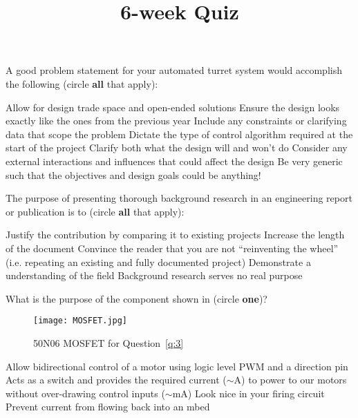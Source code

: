\documentclass[addpoints,answers]{exam}
\title{6-week Quiz}
\author{\usnaInstructorShort}
\date{\printdate{2/12/2020}}
\begin{document}
\maketitle


\begin{questions}
\question[1]
A good problem statement for your automated turret system would accomplish the following (circle {\bf all} that apply):
\begin{choices}
\CorrectChoice Allow for design trade space and open-ended solutions
\choice Ensure the design looks exactly like the ones from the previous year  
\CorrectChoice Include any constraints or clarifying data that scope the problem
\choice Dictate the type of control algorithm required at the start of the project
\CorrectChoice Clarify both what the design will and won't do 
\CorrectChoice Consider any external interactions and influences that could affect the design
\choice Be very generic such that the objectives and design goals could be anything!
\end{choices}







\question[1]
The purpose of presenting thorough background research in an engineering report or publication is to (circle {\bf all} that apply):
\begin{choices}
\CorrectChoice Justify the contribution by comparing it to existing projects
\choice Increase the length of the document 
\CorrectChoice Convince the reader that you are not ``reinventing the wheel'' (i.e. repeating an existing and fully documented project)
\CorrectChoice Demonstrate a understanding of the field
\choice Background research serves no real purpose
\end{choices}










\question[1]\label{q:3}
What is the purpose of the component shown in  (circle {\bf one})?
\begin{figure}[h]
\centering
	\texttt{[image: MOSFET.jpg]}
	\caption{50N06 MOSFET for Question~\ref{q:3}}
	\label{fig:REG3ASW}
\end{figure}
\begin{choices}
\choice Allow bidirectional control of a motor using logic level PWM and a direction pin
\CorrectChoice Acts as a switch and provides the required current ($\sim\si{\ampere}$) to power to our motors without over-drawing control inputs ($\sim\si{\milli\ampere}$)
\choice Look nice in your firing circuit
\choice Prevent current from flowing back into an mbed
\end{choices}






\end{questions}
\end{document}
